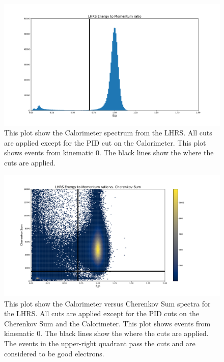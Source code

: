 \begin{figure}
\begin{center}
	\includegraphics[width=\textwidth]{./analysis/fig/LCal_pid.pdf}
	\caption{This plot show the Calorimeter spectrum from the LHRS. All cuts are applied except for the PID cut on the Calorimeter. This plot shows events from kinematic 0. The black lines show the where the cuts are applied.}
	\label{fig:cal_pid}
\end{center}
\end{figure}

\begin{figure}
\begin{center}
	\includegraphics[width=\textwidth]{./analysis/fig/LCervCal_pid.pdf}
	\caption{This plot show the Calorimeter versus Cherenkov Sum spectra for the LHRS. All cuts are applied except for the PID cuts on the Cherenkov Sum and the Calorimeter. This plot shows events from kinematic 0. The black lines show the where the cuts are applied. The events in the upper-right quadrant pass the cuts and are considered to be good electrons.}
	\label{fig:cervcal_pid}
\end{center}
\end{figure}

